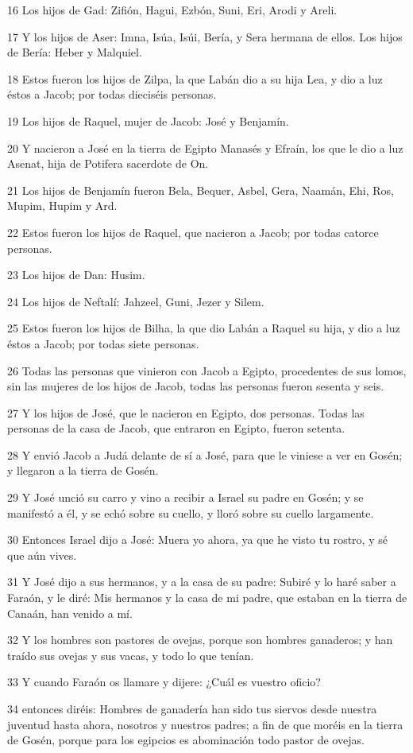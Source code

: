 \par 16 Los hijos de Gad: Zifión, Hagui, Ezbón, Suni, Eri, Arodi y Areli.
\par 17 Y los hijos de Aser: Imna, Isúa, Isúi, Bería, y Sera hermana de ellos. Los hijos de Bería: Heber y Malquiel.
\par 18 Estos fueron los hijos de Zilpa, la que Labán dio a su hija Lea, y dio a luz éstos a Jacob; por todas dieciséis personas.
\par 19 Los hijos de Raquel, mujer de Jacob: José y Benjamín.
\par 20 Y nacieron a José en la tierra de Egipto Manasés y Efraín, los que le dio a luz Asenat, hija de Potifera sacerdote de On.
\par 21 Los hijos de Benjamín fueron Bela, Bequer, Asbel, Gera, Naamán, Ehi, Ros, Mupim, Hupim y Ard.
\par 22 Estos fueron los hijos de Raquel, que nacieron a Jacob; por todas catorce personas.
\par 23 Los hijos de Dan: Husim.
\par 24 Los hijos de Neftalí: Jahzeel, Guni, Jezer y Silem.
\par 25 Estos fueron los hijos de Bilha, la que dio Labán a Raquel su hija, y dio a luz éstos a Jacob; por todas siete personas.
\par 26 Todas las personas que vinieron con Jacob a Egipto, procedentes de sus lomos, sin las mujeres de los hijos de Jacob, todas las personas fueron sesenta y seis.
\par 27 Y los hijos de José, que le nacieron en Egipto, dos personas. Todas las personas de la casa de Jacob, que entraron en Egipto, fueron setenta.
\par 28 Y envió Jacob a Judá delante de sí a José, para que le viniese a ver en Gosén; y llegaron a la tierra de Gosén.
\par 29 Y José unció su carro y vino a recibir a Israel su padre en Gosén; y se manifestó a él, y se echó sobre su cuello, y lloró sobre su cuello largamente.
\par 30 Entonces Israel dijo a José: Muera yo ahora, ya que he visto tu rostro, y sé que aún vives.
\par 31 Y José dijo a sus hermanos, y a la casa de su padre: Subiré y lo haré saber a Faraón, y le diré: Mis hermanos y la casa de mi padre, que estaban en la tierra de Canaán, han venido a mí.
\par 32 Y los hombres son pastores de ovejas, porque son hombres ganaderos; y han traído sus ovejas y sus vacas, y todo lo que tenían.
\par 33 Y cuando Faraón os llamare y dijere: ¿Cuál es vuestro oficio?
\par 34 entonces diréis: Hombres de ganadería han sido tus siervos desde nuestra juventud hasta ahora, nosotros y nuestros padres; a fin de que moréis en la tierra de Gosén, porque para los egipcios es abominación todo pastor de ovejas.

